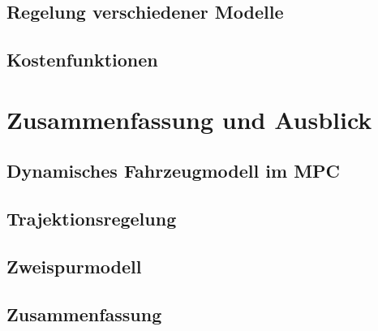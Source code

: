 \documentclass{like}
\begin{document}
\section{Regelung verschiedener Modelle}
\section{Kostenfunktionen}



\chapter[Ausblick]{Zusammenfassung und Ausblick}
\section{Dynamisches Fahrzeugmodell im MPC}
\section{Trajektionsregelung}
\section{Zweispurmodell}
\section{Zusammenfassung}



\appendix





%



%


\end{document}
